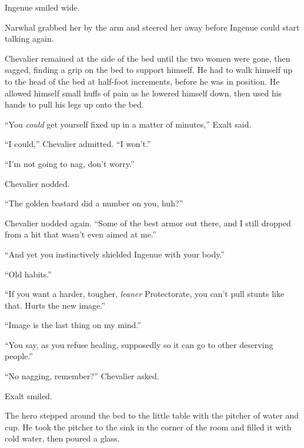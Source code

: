 Ingenue smiled wide.



Narwhal grabbed her by the arm and steered her away before Ingenue could start talking again.



Chevalier remained at the side of the bed until the two women were gone, then sagged, finding a grip on the bed to support himself.  He had to walk himself up to the head of the bed at half-foot increments, before he was in position.  He allowed himself small huffs of pain as he lowered himself down, then used his hands to pull his legs up onto the bed.



``You \emph{could} get yourself fixed up in a matter of minutes,'' Exalt said.



``I could,'' Chevalier admitted.  ``I won't.''



``I'm not going to nag, don't worry.''



Chevalier nodded.



``The golden bastard did a number on you, huh?''



Chevalier nodded again.  ``Some of the best armor out there, and I still dropped from a hit that wasn't even aimed at me.''



``And yet you instinctively shielded Ingenue with your body.''



``Old habits.''



``If you want a harder, tougher, \emph{leaner} Protectorate, you can't pull stunts like that.  Hurts the new image.''



``Image is the last thing on my mind.''



``You say, as you refuse healing, supposedly so it can go to other deserving people.''



``No nagging, remember?'' Chevalier asked.



Exalt smiled.



The hero stepped around the bed to the little table with the pitcher of water and cup.  He took the pitcher to the sink in the corner of the room and filled it with cold water, then poured a glass.



